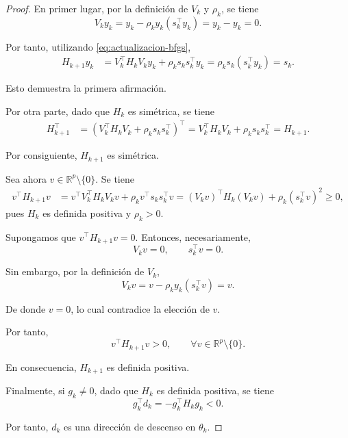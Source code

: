 \documentclass[a4paper,openany,oneside,10pt]{report}
\theoremstyle{pnlTeorema}
\theoremstyle{pnlDefinicion}
\theoremstyle{pnlObservacion}
\begin{document}
\begin{proof}
En primer lugar, por la definición de $V_k$ y $\rho_k$,
se tiene
\[
    V_k y_k
    =
    y_k-\rho_k y_k(s_k^\top y_k)
    =
    y_k-y_k
    =
    0.
\]

Por tanto, utilizando \eqref{eq:actualizacion-bfgs},
\begin{align*}
    H_{k+1}y_k
    &=
    V_k^\top H_k V_k y_k
    +\rho_k s_k s_k^\top y_k=
    \rho_k s_k(s_k^\top y_k)=s_k.
\end{align*}

Esto demuestra la primera afirmación.

Por otra parte, dado que $H_k$ es simétrica, se tiene
\begin{align*}
    H_{k+1}^\top
    &=
    \left(
        V_k^\top H_k V_k+\rho_k s_k s_k^\top
    \right)^\top=
    V_k^\top H_k V_k+\rho_k s_k s_k^\top=H_{k+1}.
\end{align*}

Por consiguiente, $H_{k+1}$ es simétrica.

Sea ahora $v\in\mathbb{R}^p\setminus\{0\}$. Se tiene
\begin{align*}
    v^\top H_{k+1}v
    &=
    v^\top V_k^\top H_k V_kv
    +\rho_k v^\top s_k s_k^\top v=
    (V_kv)^\top H_k(V_kv)
    +\rho_k(s_k^\top v)^2\geq 0,
\end{align*}
pues $H_k$ es definida positiva y $\rho_k>0$.

Supongamos que $v^\top H_{k+1}v=0$. Entonces,
necesariamente,
\[
    V_kv=0,
    \qquad
    s_k^\top v=0.
\]

Sin embargo, por la definición de $V_k$,
\[
    V_kv
    =
    v-\rho_k y_k(s_k^\top v)
    =
    v.
\]

De donde $v=0$, lo cual contradice la elección de $v$.

Por tanto,
\[
    v^\top H_{k+1}v>0,
    \qquad
    \forall v\in\mathbb{R}^p\setminus\{0\}.
\]

En consecuencia, $H_{k+1}$ es definida positiva.

Finalmente, si $g_k\neq 0$, dado que $H_k$ es definida
positiva, se tiene
\[
    g_k^\top d_k
    =
    -g_k^\top H_k g_k
    <0.
\]

Por tanto, $d_k$ es una dirección de descenso en $\theta_k$.
\end{proof}
\end{document}
